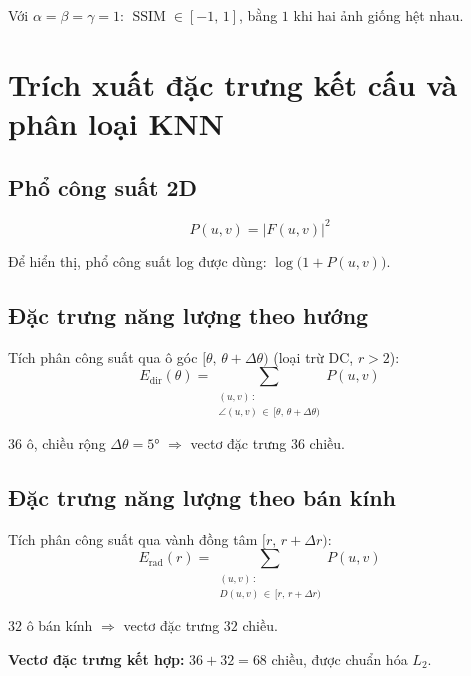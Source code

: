 \documentclass[12pt, a4paper]{article}
\begin{document}
Với $\alpha = \beta = \gamma = 1$: $\operatorname{SSIM} \in [-1,\,1]$,
bằng $1$ khi hai ảnh giống hệt nhau.

\section{Trích xuất đặc trưng kết cấu và phân loại KNN}

\subsection{Phổ công suất 2D}

\begin{equation}
  P(u,v) = \lvert F(u,v) \rvert^2
  \label{eq:power_spectrum}
\end{equation}

Để hiển thị, phổ công suất log được dùng:
$\log\!\bigl(1 + P(u,v)\bigr)$.

\subsection{Đặc trưng năng lượng theo hướng}

Tích phân công suất qua ô góc $[\theta,\, \theta + \Delta\theta)$
(loại trừ DC, $r > 2$):
\begin{equation}
  E_{\mathrm{dir}}(\theta)
  = \sum_{\substack{(u,v)\,:\\ \angle(u,v)\,\in\,[\theta,\,\theta+\Delta\theta)}}
    P(u,v)
  \label{eq:feat_dir}
\end{equation}

$36$ ô, chiều rộng $\Delta\theta = 5°$ $\Rightarrow$ vectơ đặc trưng $36$ chiều.

\subsection{Đặc trưng năng lượng theo bán kính}

Tích phân công suất qua vành đồng tâm $[r,\, r + \Delta r)$:
\begin{equation}
  E_{\mathrm{rad}}(r)
  = \sum_{\substack{(u,v)\,:\\ D(u,v)\,\in\,[r,\,r+\Delta r)}}
    P(u,v)
  \label{eq:feat_rad}
\end{equation}

$32$ ô bán kính $\Rightarrow$ vectơ đặc trưng $32$ chiều.

\textbf{Vectơ đặc trưng kết hợp:} $36 + 32 = 68$ chiều,
được chuẩn hóa $L_2$.
\end{document}
